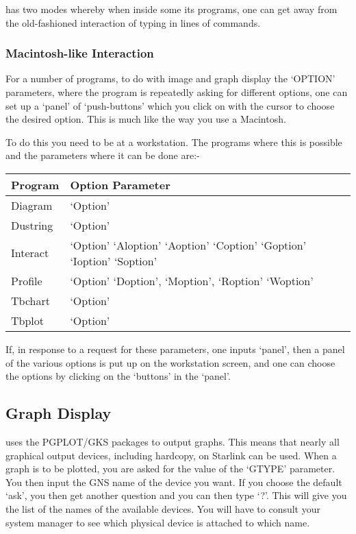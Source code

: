 \starman has two modes whereby when inside some its programs, one can
get away from the old-fashioned interaction of typing in lines of
commands.

\subsubsection{Macintosh-like Interaction}

For a number of programs, to do with image and graph display the
`OPTION' parameters, where the program is repeatedly asking for
different options, one can set up a `panel' of `push-buttons' which you
click on with the cursor to choose the desired option. This is much
like the way you use a Macintosh.

To do this you need to be at a workstation. The programs where this is
possible and the parameters where it can be done are:-

\hspace{4ex}\begin{tabular}{|l|l|} \hline Program    & Option Parameter
\\ \hline Diagram &   `Option' \\ Dustring & `Option' \\ Interact  &
`Option' `Aloption' `Aoption' `Coption' `Goption'
	    `Ioption' `Soption' \\
Profile & `Option' `Doption', `Moption', `Roption' `Woption' \\
Tbchart  & `Option' \\ Tbplot & `Option' \\ \hline \end{tabular}

If, in response to a request for these parameters, one inputs `panel',
then a panel of the various options is put up on the workstation
screen, and one can choose the options by clicking on the `buttons' in
the `panel'.


\subsection{Graph Display}


\starman uses the PGPLOT/GKS packages to output graphs. This means that
nearly all graphical output devices, including hardcopy, on Starlink
can be used. When a graph is to be plotted, you are asked for the value
of the `GTYPE' parameter. You then input the GNS name of the device you
want. If you choose the default `ask', you then get another question
and you can then type `?'. This will give you the list of the names of
the available devices. You will have to consult your system manager to
see which physical device is attached to which name.

